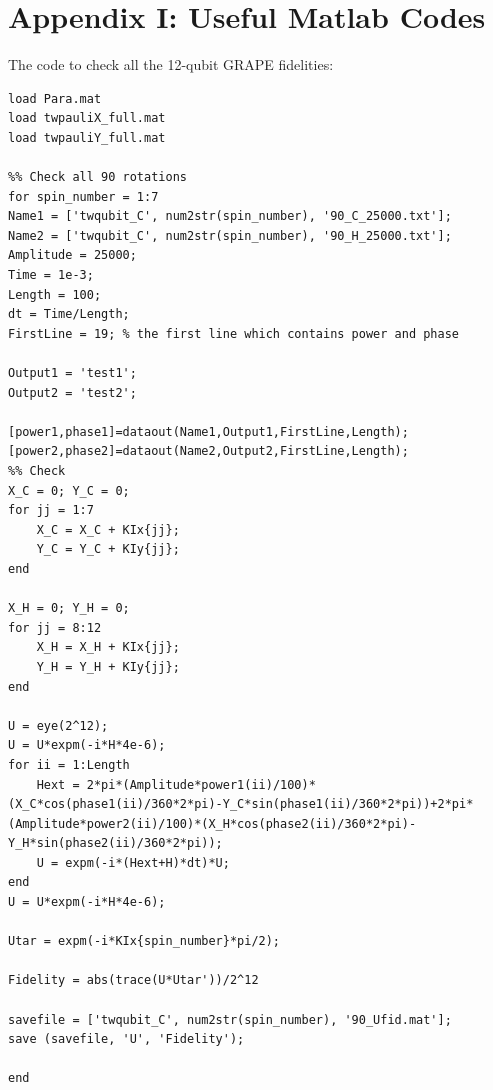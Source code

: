 \clearpage
\section{Appendix I: Useful Matlab Codes}
\hypertarget{code:check_grape}{The code to check all the 12-qubit GRAPE fidelities:}
\begin{lstlisting}
load Para.mat
load twpauliX_full.mat
load twpauliY_full.mat

%% Check all 90 rotations
for spin_number = 1:7
Name1 = ['twqubit_C', num2str(spin_number), '90_C_25000.txt'];
Name2 = ['twqubit_C', num2str(spin_number), '90_H_25000.txt'];
Amplitude = 25000;
Time = 1e-3;
Length = 100;
dt = Time/Length;
FirstLine = 19; % the first line which contains power and phase

Output1 = 'test1';
Output2 = 'test2';

[power1,phase1]=dataout(Name1,Output1,FirstLine,Length);
[power2,phase2]=dataout(Name2,Output2,FirstLine,Length);
%% Check
X_C = 0; Y_C = 0;
for jj = 1:7
    X_C = X_C + KIx{jj};
    Y_C = Y_C + KIy{jj};
end

X_H = 0; Y_H = 0;
for jj = 8:12
    X_H = X_H + KIx{jj};
    Y_H = Y_H + KIy{jj};
end

U = eye(2^12);
U = U*expm(-i*H*4e-6);
for ii = 1:Length
    Hext = 2*pi*(Amplitude*power1(ii)/100)*(X_C*cos(phase1(ii)/360*2*pi)-Y_C*sin(phase1(ii)/360*2*pi))+2*pi*(Amplitude*power2(ii)/100)*(X_H*cos(phase2(ii)/360*2*pi)-Y_H*sin(phase2(ii)/360*2*pi));
    U = expm(-i*(Hext+H)*dt)*U;
end
U = U*expm(-i*H*4e-6);

Utar = expm(-i*KIx{spin_number}*pi/2);

Fidelity = abs(trace(U*Utar'))/2^12

savefile = ['twqubit_C', num2str(spin_number), '90_Ufid.mat'];
save (savefile, 'U', 'Fidelity');

end
\end{lstlisting}

